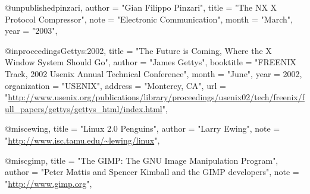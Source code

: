 @unpublished{pinzari,
 author		= "Gian Filippo Pinzari",
 title		= "The NX X Protocol Compressor",
 note		= "Electronic Communication",
 month		= "March",
 year		= "2003",
 }
 
@inproceedings{Gettys:2002,
  title = "{The Future is Coming, Where the X Window System Should Go}",
  author        = "James Gettys",
  booktitle	= "FREENIX Track, 2002 Usenix Annual Technical Conference",
  month		= "June",
  year		= 2002,
  organization	= "USENIX",
  address       = "Monterey, CA",
  url = "\url{http://www.usenix.org/publications/library/proceedings/usenix02/tech/freenix/full_papers/gettys/gettys_html/index.html}",
}

@misc{ewing,
 title          = "Linux 2.0 Penguins",
 author         = "Larry Ewing",
 note           = "\url{http://www.isc.tamu.edu/~lewing/linux}",
}

@misc{gimp,
 title          = "The {GIMP}: The {GNU} Image Manipulation Program",
 author         = "Peter Mattis and Spencer Kimball and the GIMP developers",
 note           = "\url{http://www.gimp.org}",
}

